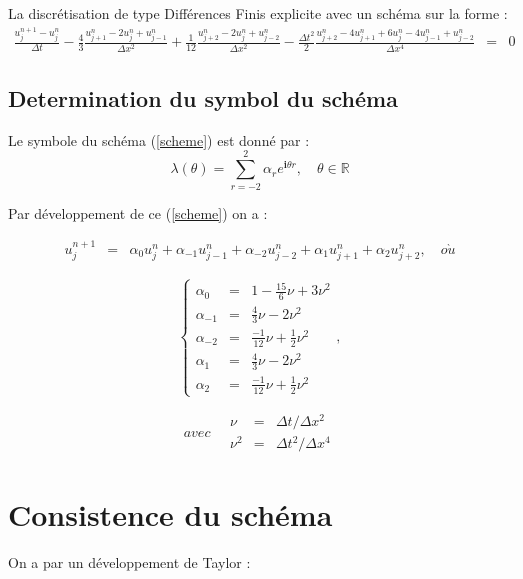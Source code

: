 \documentclass[a4paper,11pt]{article}
\begin{document}
La discrétisation de type Différences Finis explicite avec un schéma sur la forme :
\begin{equation}
    \begin{array}{rcl}
        \frac{u^{n+1}_{j} - u^{n}_{j}}{\Delta t}
        -\frac{4}{3} \frac{u^{n}_{j+1} - 2u^{n}_{j} + u^{n}_{j-1}}{\Delta x^{2}}
        +\frac{1}{12} \frac{u^{n}_{j+2} - 2u^{n}_{j} + u^{n}_{j-2}}{\Delta x^{2}}
        -\frac{\Delta t^{2}}{2} \frac{u^{n}_{j+2} - 4u^{n}_{j+1} + 6u^{n}_{j}  - 4u^{n}_{j-1} + u^{n}_{j-2}}{\Delta x^{4}}  &=& 0 \label{scheme}
    \end{array}
\end{equation}


\subsection{Determination du symbol du schéma}

Le symbole du schéma (\ref{scheme}) est donné par :
\begin{equation*}
\lambda(\theta) = \sum \limits_{r=-2}^{2} \alpha_{r} e^{\mathbf{i} \theta r}, \quad \theta \in \mathbb{R}
\end{equation*}

Par développement de ce (\ref{scheme}) on a :

\begin{equation*}
    \begin{array}{rcl}
        u^{n+1}_{j} &=& \alpha_{0} u^{n}_{j} + \alpha_{-1} u^{n}_{j-1} + \alpha_{-2} u^{n}_{j-2} + \alpha_{1} u^{n}_{j+1}  + \alpha_{2} u^{n}_{j+2}, \quad o\grave{u}
    \end{array}
\end{equation*}

\begin{equation*}
    \left\{
    \begin{array}{rcl}
        \alpha_{0} &=& 1 - \scriptstyle \frac{15}{6} \nu + 3 \nu^{2} \\
        \alpha_{-1} &=& \scriptstyle \frac{4}{3} \nu - 2 \nu^{2} \\
        \alpha_{-2} &=& \scriptstyle \frac{-1}{12} \nu + \frac{1}{2} \nu^{2} \\
        \alpha_{1} &=& \scriptstyle \frac{4}{3} \nu - 2 \nu^{2} \\
        \alpha_{2} &=& \scriptstyle \frac{-1}{12} \nu + \frac{1}{2} \nu^{2}
    \end{array}
    \right.,
\end{equation*}

\begin{equation*}
    avec \quad
    \begin{array}{rcl}
        \nu &=& \Delta t/\Delta x^{2} \\
        \nu^{2} &=& \Delta t^{2}/\Delta x^{4}
    \end{array}
\end{equation*}


\section{Consistence du schéma}

On a par un développement de Taylor :
\end{document}

